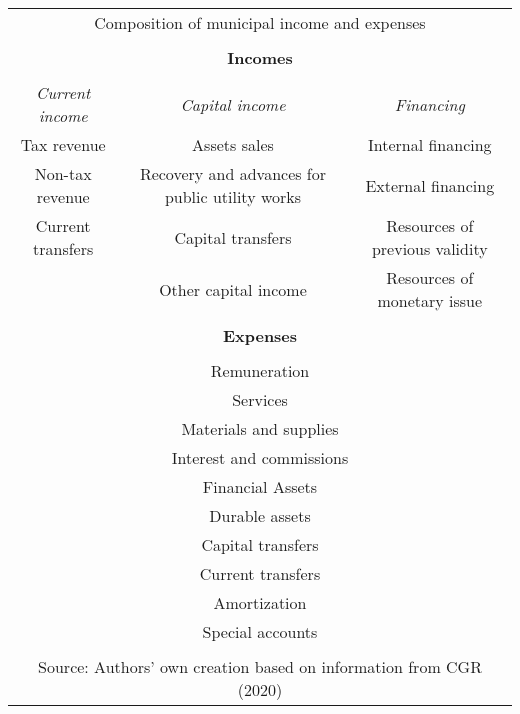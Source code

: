 \begin{table}[]
	\begin{tabular}{cll}
		\multicolumn{3}{c}{Composition of municipal income and expenses} \\
		\multicolumn{1}{l}{} &  &  \\ \hline
		\multicolumn{3}{|c|}{\textbf{Incomes}} \\ \hline
		\multicolumn{1}{l}{} &  &  \\ \hline
		\multicolumn{1}{|c|}{\textit{Current income}} & \multicolumn{1}{c|}{\textit{Capital income}} & \multicolumn{1}{c|}{\textit{Financing}} \\ \hline
		Tax revenue & \multicolumn{1}{c}{Assets sales} & \multicolumn{1}{c}{Internal financing} \\
		Non-tax revenue & \multicolumn{1}{c}{Recovery and advances for public utility works} & \multicolumn{1}{c}{External financing} \\
		Current transfers & \multicolumn{1}{c}{Capital transfers} & \multicolumn{1}{c}{Resources of previous validity} \\
		& \multicolumn{1}{c}{Other capital income} & \multicolumn{1}{c}{Resources of monetary issue} \\
		\multicolumn{1}{l}{} &  &  \\ \hline
		\multicolumn{3}{|c|}{\textbf{Expenses}} \\ \hline
		\multicolumn{1}{l}{} &  &  \\
		\multicolumn{3}{c}{Remuneration} \\
		\multicolumn{3}{c}{Services} \\
		\multicolumn{3}{c}{Materials and supplies} \\
		\multicolumn{3}{c}{Interest and commissions} \\
		\multicolumn{3}{c}{Financial Assets} \\
		\multicolumn{3}{c}{Durable assets} \\
		\multicolumn{3}{c}{Capital transfers} \\
		\multicolumn{3}{c}{Current transfers} \\
		\multicolumn{3}{c}{Amortization} \\
		\multicolumn{3}{c}{Special accounts} \\
		\multicolumn{1}{l}{} &  &  \\
		\multicolumn{3}{c}{Source: Authors' own creation based on information from CGR (2020)}
		
	\end{tabular}
\end{table}